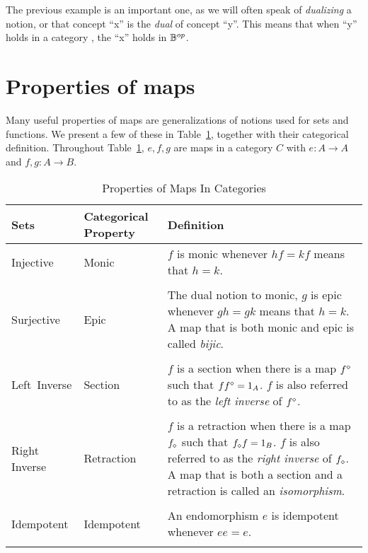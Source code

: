 The previous example is an important one, as we will often speak of \emph{dualizing} a notion, or
that concept ``x'' is the \emph{dual} of concept ``y''. This means that when ``y'' holds in a
category \B, the ``x'' holds in $\mathbb{B}^{op}$.

\section{Properties of maps} %
\label{sub:properties_of_maps}
Many useful properties of maps are generalizations of notions used for sets and functions. We
present a few of these in Table~\ref{tab:properties_of_maps_in_categories}, together with their
categorical definition. Throughout Table~\ref{tab:properties_of_maps_in_categories}, $e,f,g$ are
maps in a category $C$ with $e:A \to A$ and $f,g:A \to B$.
\begin{table}[!htbp]
  \begin{center}
    \begin{tabular}{|p{1in}p{1in}p{3.78in}|}
      \hline
      {\bf Sets} & {\bf Categorical Property} & {\bf Definition}\\
      \hline
      \hline
      Injective & Monic & $f$ is monic whenever $h f = k f$ means that $h = k$.\\
      & & \\
      \hline
      Surjective & Epic & {The dual notion to monic, $g$ is epic whenever $g h = g k$ means that $h = k$.
      A map that is both monic and epic is called \emph{bijic}.}\\
      & & \\
      \hline
      Left~Inverse & Section & $f$ is a section when there is a map ${f}^\diamond$ such that $f {f}^\diamond = 1_A$. $f$
      is also referred to as the \emph{left inverse} of ${f}^\diamond$.\\
      & & \\
      \hline
      Right Inverse & Retraction & $f$ is a retraction when there is a map ${f}_\diamond$ such that ${f}_\diamond f = 1_B$.
      $f$ is also referred to as the \emph{right inverse} of ${f}_\diamond$. A map that is both a section and a
      retraction is called an \emph{isomorphism}.\\
      & & \\
      \hline
      Idempotent & Idempotent & An endomorphism $e$ is idempotent whenever $e e = e$.\\
      & & \\
      \hline
    \end{tabular}
  \end{center}
  \caption{Properties of Maps In Categories}
  \label{tab:properties_of_maps_in_categories}
\end{table}

